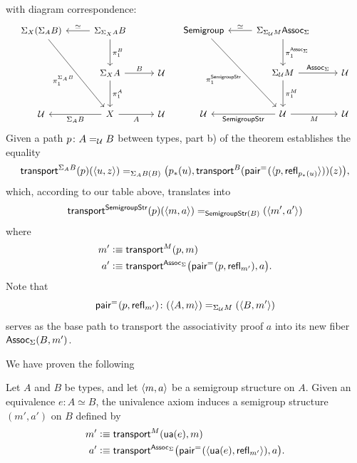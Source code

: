 with diagram correspondence:
\[
    \begin{tikzcd}[row sep=large,font=\small]
        \Sigma_X(\Sigma_AB)
                \arrow[rdd,"\pi_1^{\Sigma_AB}"']
            &\Sigma_{\Sigma_XA}B
                \arrow[d,"\pi_1^B"]
                \arrow[l,"\simeq"']\\
            &\Sigma_XA
                \arrow[d,"\pi_1^A"]
                \arrow[r,"B"]
            &\univ\\
        \univ
            &X
                \arrow[l,"\Sigma_AB"]
                \arrow[r,"A"']
            &\univ
    \end{tikzcd}
    \quad
    \begin{tikzcd}[row sep=large,font=\small]
        \fun{Semigroup}
                \arrow[rdd,"\pi_1^{\fun{SemigroupStr}}"']
            &\Sigma_{\Sigma_\univ M}\fun{Assoc}_\Sigma
                \arrow[d,"\pi_1^{\fun{Assoc}_\Sigma}"]
                \arrow[l,"\simeq"']\\
            &\Sigma_\univ M
                \arrow[d,"\pi_1^M"]
                \arrow[r,"\fun{Assoc}_\Sigma"]
            &\univ\\
        \univ
            &\univ
                \arrow[l,"\fun{SemigroupStr}"]
                \arrow[r,"M"']
            &\univ
    \end{tikzcd}
\]
Given a path $p\colon A\eq{\univ} B$ between types, part b) of the theorem establishes the equality
\[
    \mathsf{transport}^{\Sigma_AB}(p)(\langle u,z\rangle)
        \mathrel{=_{\Sigma_AB(B)}}
        \bigl(
            p_*(u),\mathsf{transport}^B
                (\mathsf{pair}^{\mathrel{=_{}}}(\langle p,\mathsf{refl}_{p_*(u)}\rangle))(z)
        \bigr),
\]
which, according to our table above, translates into      
\[
    \fun{transport}^{\fun{SemigroupStr}}(p)(\dep{m,a})
    \eq{\fun{SemigroupStr}(B)}
    (\dep{m',a'})
\]
where
\begin{align*}
    m'&\mathrel{\vcentcolon}\equiv\mathsf{transport}^M(p,m)\\
    a'&\mathrel{\vcentcolon}\equiv\mathsf{transport}^{\mathsf{Assoc}_{\Sigma}}
        \bigl(\mathsf{pair}^{\mathrel{=_{}}}(p,\mathsf{refl}_{m'}),a\bigr).
\end{align*}
Note that
\[
    \fun{pair}^{\eq{}}(p,\fun{refl}_{m'})\colon(\dep{A,m})
        \eq{\Sigma_\univ M}(\dep{B,m'})
\]
serves as the base path to transport the associativity proof $a$ into its new fiber $\mathsf{Assoc}_{\Sigma}(B,m')$.

We have proven the following
\begin{thm}\ua
    Let\/ $A$ and\/ $B$ be types, and let\/ $\langle m,a\rangle$ be a semigroup structure on\/ $A$. Given an equivalence\/ $e\colon A\simeq B$, the univalence axiom induces a semigroup structure\/ $(m',a')$ on\/ $B$ defined by
    \begin{align*}
        m'&\mathrel{\vcentcolon}\equiv\mathsf{transport}^M(\mathsf{ua}(e),m)\\
        a'&\mathrel{\vcentcolon}\equiv\mathsf{transport}^{\mathsf{Assoc}_{\Sigma}}
            \bigl(\mathsf{pair}^{\mathrel{=_{}}}(\langle\mathsf{ua}(e),\mathsf{refl}_{m'}\rangle),a\bigr).
    \end{align*}
\end{thm}

